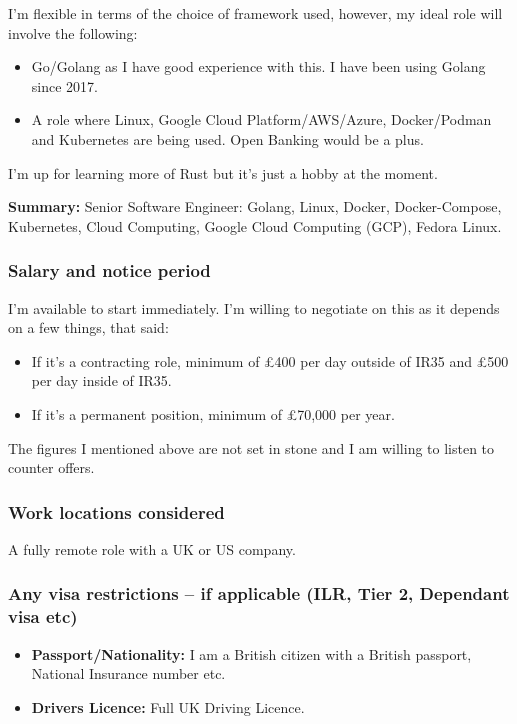 \documentclass[
  a4paper,
]{article}
\providecommand{\tightlist}{%
  \setlength{\itemsep}{0pt}\setlength{\parskip}{0pt}}
\begin{document}
I'm flexible in terms of the choice of framework used, however, my ideal
role will involve the following:

\begin{itemize}
\tightlist
\item
  Go/Golang as I have good experience with this. I have been using
  Golang since 2017.
\item
  A role where Linux, Google Cloud Platform/AWS/Azure, Docker/Podman and
  Kubernetes are being used. Open Banking would be a plus.
\end{itemize}

I'm up for learning more of Rust but it's just a hobby at the moment.

\textbf{Summary:} Senior Software Engineer: Golang, Linux, Docker,
Docker-Compose, Kubernetes, Cloud Computing, Google Cloud Computing
(GCP), Fedora Linux.

\hypertarget{salary-and-notice-period}{%
\subsubsection{Salary and notice
period}\label{salary-and-notice-period}}

I'm available to start immediately. I'm willing to negotiate on this as
it depends on a few things, that said:

\begin{itemize}
\tightlist
\item
  If it's a contracting role, minimum of £400 per day outside of IR35
  and £500 per day inside of IR35.
\item
  If it's a permanent position, minimum of £70,000 per year.
\end{itemize}

The figures I mentioned above are not set in stone and I am willing to
listen to counter offers.

\hypertarget{work-locations-considered}{%
\subsubsection{Work locations
considered}\label{work-locations-considered}}

A fully remote role with a UK or US company.

\hypertarget{any-visa-restrictions-if-applicable-ilr-tier-2-dependant-visa-etc}{%
\subsubsection{Any visa restrictions -- if applicable (ILR, Tier 2,
Dependant visa
etc)}\label{any-visa-restrictions-if-applicable-ilr-tier-2-dependant-visa-etc}}

\begin{itemize}
\tightlist
\item
  \textbf{Passport/Nationality:} I am a British citizen with a British
  passport, National Insurance number etc.
\item
  \textbf{Drivers Licence:} Full UK Driving Licence.
\end{itemize}
\end{document}

